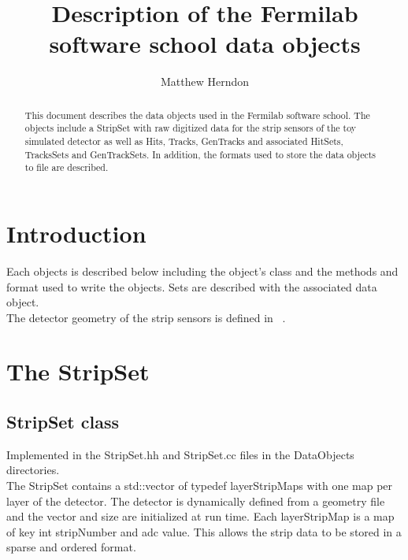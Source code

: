 \documentclass[aps,prd,superscriptaddress,floatfix]{revtex4}
\begin{document}


\title{  
\vspace{0.5cm}
Description of the Fermilab software school data objects
}

\author {Matthew Herndon}

\address{University of Wisconsin, Madison, Wisconsin, Fermi
  National Accelerator Laboratory, Illinois}


\begin{abstract}
\vskip 0.5cm
\noindent
This document describes the data objects used in the Fermilab software school.
The objects include a StripSet with raw digitized data for the strip sensors
of the toy simulated detector as well as Hits, Tracks, GenTracks and associated
HitSets, TracksSets and GenTrackSets.  In addition, the formats used to store the
data objects to file are described.
\end{abstract}
\maketitle


\vspace{0.3cm}

\section{Introduction}
Each objects is described below including the object's class and the methods and
format used to write the objects.  Sets are described with the associated data
object.
\\

The detector geometry of the strip sensors is defined in ~\cite{detectorGeometry}.


\section{The StripSet}
\subsection{StripSet class}
Implemented in the StripSet.hh and StripSet.cc files in the DataObjects directories.
\\

The StripSet contains a std::vector of typedef layerStripMaps with one map per layer of the detector.
The detector is dynamically defined from a geometry file and the vector and size are initialized
at run time.  Each layerStripMap is a map of key int stripNumber and adc value.  This allows
the strip data to be stored in a sparse and ordered format.
\\
\end{document}
